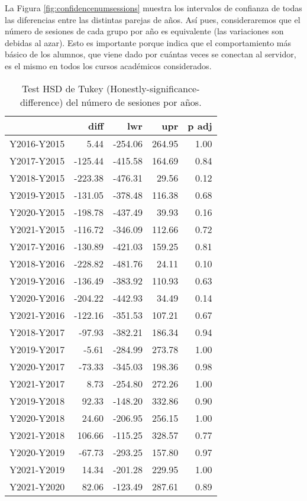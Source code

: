 La Figura \ref{fig:confidencenumsessions} muestra los intervalos de confianza de todas las diferencias entre las distintas parejas de años. Así pues, consideraremos que el número de sesiones de cada grupo por año es equivalente (las variaciones son debidas al azar). Esto es importante porque indica que el comportamiento más básico de los alumnos, que viene dado por cuántas veces se conectan al servidor, es el mismo en todos los cursos académicos considerados.

\begin{table}[H]
\centering
\caption{Test HSD de Tukey (Honestly-significance-difference) del número de sesiones por años.}
\label{tab:Tukeynumsessions}
\begin{tabular}{rrrrr}
  \hline
 & diff & lwr & upr & p adj \\ 
  \hline
Y2016-Y2015 & 5.44 & -254.06 & 264.95 & 1.00 \\ 
  Y2017-Y2015 & -125.44 & -415.58 & 164.69 & 0.84 \\ 
  Y2018-Y2015 & -223.38 & -476.31 & 29.56 & 0.12 \\ 
  Y2019-Y2015 & -131.05 & -378.48 & 116.38 & 0.68 \\ 
  Y2020-Y2015 & -198.78 & -437.49 & 39.93 & 0.16 \\ 
  Y2021-Y2015 & -116.72 & -346.09 & 112.66 & 0.72 \\ 
  Y2017-Y2016 & -130.89 & -421.03 & 159.25 & 0.81 \\ 
  Y2018-Y2016 & -228.82 & -481.76 & 24.11 & 0.10 \\ 
  Y2019-Y2016 & -136.49 & -383.92 & 110.93 & 0.63 \\ 
  Y2020-Y2016 & -204.22 & -442.93 & 34.49 & 0.14 \\ 
  Y2021-Y2016 & -122.16 & -351.53 & 107.21 & 0.67 \\ 
  Y2018-Y2017 & -97.93 & -382.21 & 186.34 & 0.94 \\ 
  Y2019-Y2017 & -5.61 & -284.99 & 273.78 & 1.00 \\ 
  Y2020-Y2017 & -73.33 & -345.03 & 198.36 & 0.98 \\ 
  Y2021-Y2017 & 8.73 & -254.80 & 272.26 & 1.00 \\ 
  Y2019-Y2018 & 92.33 & -148.20 & 332.86 & 0.90 \\ 
  Y2020-Y2018 & 24.60 & -206.95 & 256.15 & 1.00 \\ 
  Y2021-Y2018 & 106.66 & -115.25 & 328.57 & 0.77 \\ 
  Y2020-Y2019 & -67.73 & -293.25 & 157.80 & 0.97 \\ 
  Y2021-Y2019 & 14.34 & -201.28 & 229.95 & 1.00 \\ 
  Y2021-Y2020 & 82.06 & -123.49 & 287.61 & 0.89 \\ 
   \hline
\end{tabular}
\end{table}

